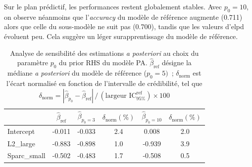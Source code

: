 \medskip 

Sur le plan prédictif, les performances restent globalement stables. Avec $p_0 = 10$, on observe néanmoins que l'\textit{accuracy} du modèle de référence augmente (0.711) alors que celle du sous-modèle ne suit pas (0.700), tandis que les valeurs d'elpd évoluent peu. Cela suggère un léger surapprentissage du modèle de référence. 

\begin{table}[ht]
	\centering
	\begin{tabular}{lccccc}
		\hline
		& $\hat\beta_{\text{ref}}$ & $\hat\beta_{p_0=3}$ & $\delta_{\text{norm}} (\%)$ & $\hat\beta_{p_0=10}$ & $\delta_{\text{norm}} (\%)$ \\
		\hline
		Intercept    & -0.011 & -0.033 & 2.4 & 0.008  & 2.0 \\ 
		L2\_large    & -0.883 & -0.898 & 1.0 & -0.939 & 3.9 \\
		Sparc\_small & -0.502 & -0.483 & 1.7 & -0.508 & 0.5 \\
		\hline
	\end{tabular}
	\caption[Analyse de sensibilité au prior $p_0$, modèle PA]{Analyse de sensibilité des estimations \textit{a posteriori} au choix du paramètre $p_0$ du prior RHS du modèle PA. $\hat\beta_{\text{ref}}$ désigne la médiane \textit{a posteriori} du modèle de référence ($p_0 = 5)$~; $\delta_{\text{norm}}$ est l'écart normalisé en fonction de l'intervalle de crédibilité, tel que $\delta_{\text{norm}} = |\hat\beta_{p_0} - \hat\beta_{\text{ref}}|\,/\,(\text{largeur IC}_{95\%}^{\text{ref}}) \times 100$}
	\label{table:sensi_PA}
\end{table}

%
%

%
%


